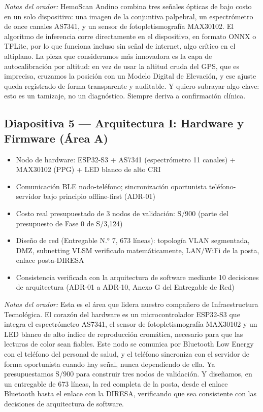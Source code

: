 \documentclass[11pt,a4paper]{article}
\providecommand{\tightlist}{%
  \setlength{\itemsep}{0pt}\setlength{\parskip}{0pt}}
\begin{document}
\emph{Notas del orador:} HemoScan Andino combina tres señales ópticas de bajo costo en un solo dispositivo: una imagen de la conjuntiva palpebral, un espectrómetro de once canales AS7341, y un sensor de fotopletismografía MAX30102. El algoritmo de inferencia corre directamente en el dispositivo, en formato ONNX o TFLite, por lo que funciona incluso sin señal de internet, algo crítico en el altiplano. La pieza que consideramos más innovadora es la capa de autocalibración por altitud: en vez de usar la altitud cruda del GPS, que es imprecisa, cruzamos la posición con un Modelo Digital de Elevación, y ese ajuste queda registrado de forma transparente y auditable. Y quiero subrayar algo clave: esto es un tamizaje, no un diagnóstico. Siempre deriva a confirmación clínica.

\subsection{Diapositiva 5 --- Arquitectura I: Hardware y Firmware (Área A)}\label{diapositiva-5-arquitectura-i-hardware-y-firmware-uxe1rea-a}

\begin{itemize}
\tightlist
\item
  Nodo de hardware: ESP32-S3 + AS7341 (espectrómetro 11 canales) + MAX30102 (PPG) + LED blanco de alto CRI
\item
  Comunicación BLE nodo-teléfono; sincronización oportunista teléfono-servidor bajo principio offline-first (ADR-01)
\item
  Costo real presupuestado de 3 nodos de validación: S/900 (parte del presupuesto de Fase 0 de S/3,124)
\item
  Diseño de red (Entregable N.° 7, 673 líneas): topología VLAN segmentada, DMZ, subnetting VLSM verificado matemáticamente, LAN/WiFi de la posta, enlace posta-DIRESA
\item
  Consistencia verificada con la arquitectura de software mediante 10 decisiones de arquitectura (ADR-01 a ADR-10, Anexo G del Entregable de Red)
\end{itemize}

\emph{Notas del orador:} Esta es el área que lidera nuestro compañero de Infraestructura Tecnológica. El corazón del hardware es un microcontrolador ESP32-S3 que integra el espectrómetro AS7341, el sensor de fotopletismografía MAX30102 y un LED blanco de alto índice de reproducción cromática, necesario para que las lecturas de color sean fiables. Este nodo se comunica por Bluetooth Low Energy con el teléfono del personal de salud, y el teléfono sincroniza con el servidor de forma oportunista cuando hay señal, nunca dependiendo de ella. Ya presupuestamos S/900 para construir tres nodos de validación. Y diseñamos, en un entregable de 673 líneas, la red completa de la posta, desde el enlace Bluetooth hasta el enlace con la DIRESA, verificando que sea consistente con las decisiones de arquitectura de software.
\end{document}
